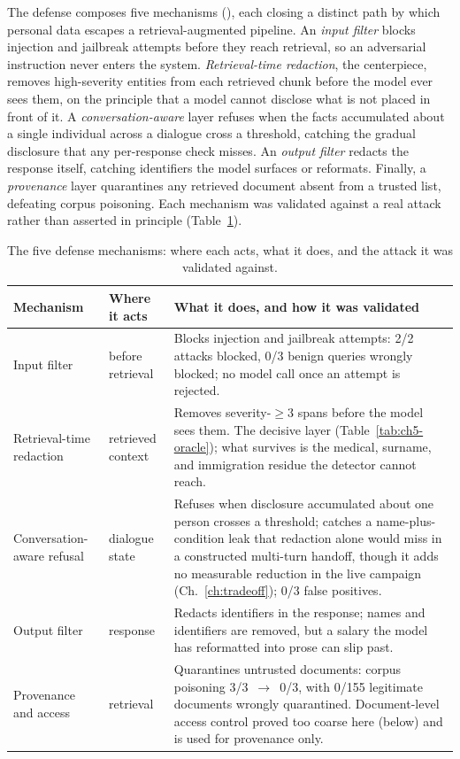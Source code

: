 The defense composes five mechanisms (), each closing a distinct path by which personal data
escapes a retrieval-augmented pipeline. An \emph{input filter} blocks injection and
jailbreak attempts before they reach retrieval, so an adversarial instruction never enters
the system. \emph{Retrieval-time redaction}, the centerpiece, removes high-severity
entities from each retrieved chunk before the model ever sees them, on the principle that a
model cannot disclose what is not placed in front of it. A \emph{conversation-aware} layer
refuses when the facts accumulated about a single individual across a dialogue cross a
threshold, catching the gradual disclosure that any per-response check misses. An
\emph{output filter} redacts the response itself, catching identifiers the model surfaces
or reformats. Finally, a \emph{provenance} layer quarantines any retrieved document absent
from a trusted list, defeating corpus poisoning. Each mechanism was validated against a
real attack rather than asserted in principle (Table~\ref{tab:ch5-layers}).

\begin{table}[h]
\centering
\caption{The five defense mechanisms: where each acts, what it does, and the attack it was
validated against.}
\label{tab:ch5-layers}
\begin{tabularx}{\textwidth}{lp{2.6cm}X}
\toprule
\textbf{Mechanism} & \textbf{Where it acts} & \textbf{What it does, and how it was validated}\\
\midrule
Input filter & before retrieval & Blocks injection and jailbreak attempts: 2/2 attacks blocked, 0/3 benign queries wrongly blocked; no model call once an attempt is rejected.\\
Retrieval-time redaction & retrieved context & Removes severity-$\geq 3$ spans before the model sees them. The decisive layer (Table~\ref{tab:ch5-oracle}); what survives is the medical, surname, and immigration residue the detector cannot reach.\\
Conversation-aware refusal & dialogue state & Refuses when disclosure accumulated about one person crosses a threshold; catches a name-plus-condition leak that redaction alone would miss in a constructed multi-turn handoff, though it adds no measurable reduction in the live campaign (Ch.~\ref{ch:tradeoff}); 0/3 false positives.\\
Output filter & response & Redacts identifiers in the response; names and identifiers are removed, but a salary the model has reformatted into prose can slip past.\\
Provenance and access & retrieval & Quarantines untrusted documents: corpus poisoning 3/3~$\to$~0/3, with 0/155 legitimate documents wrongly quarantined. Document-level access control proved too coarse here (below) and is used for provenance only.\\
\bottomrule
\end{tabularx}
\end{table}

